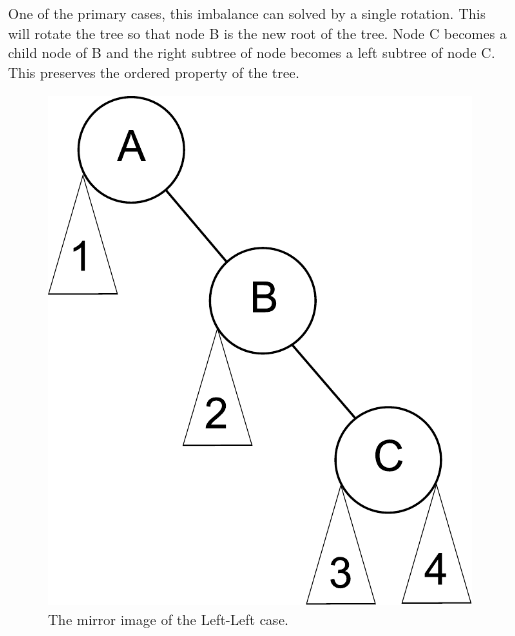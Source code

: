 One of the primary cases, this imbalance can solved by a single rotation.
This will rotate the tree so that node B is the new root of the tree.
Node C becomes a child node of B and the right subtree of node becomes a left subtree of node C.
This preserves the ordered property of the tree.

\begin{figure}[h]
\includegraphics[width=.33\textwidth]{right_right.pdf}
\caption{The mirror image of the Left-Left case.}
\end{figure}


